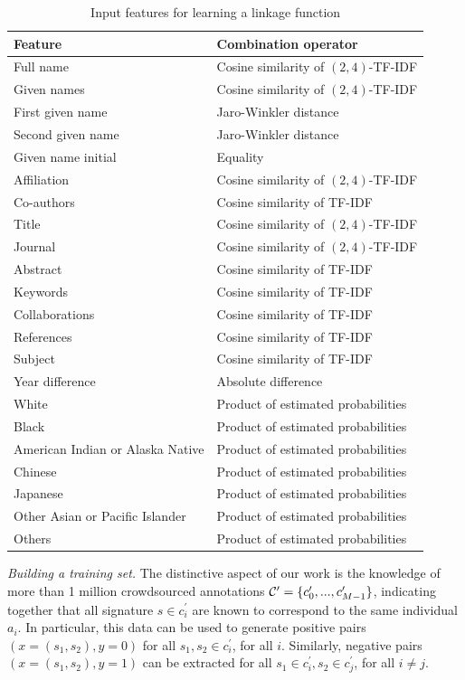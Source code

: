 \documentclass{article}
\newcommand{\glnote}[1]{\textcolor{red}{[GL: #1]}}
\begin{document}
\begin{table}
\caption{Input features for learning a linkage function}
\label{table:features}
\centering
\begin{tabular}{|l|l|}
  \hline
  \textbf{Feature} & \textbf{Combination operator}\\
  \hline
  \hline
  Full name & Cosine similarity of $(2,4)$-TF-IDF\\
  Given names & Cosine similarity of $(2,4)$-TF-IDF\\
  First given name & Jaro-Winkler distance\\
  Second given name & Jaro-Winkler distance\\
  Given name initial & Equality\\
  Affiliation & Cosine similarity of $(2,4)$-TF-IDF\\
  Co-authors & Cosine similarity of TF-IDF\\
  Title & Cosine similarity of $(2,4)$-TF-IDF\\
  Journal & Cosine similarity of $(2,4)$-TF-IDF\\
  Abstract & Cosine similarity of TF-IDF\\
  Keywords & Cosine similarity of TF-IDF\\
  Collaborations & Cosine similarity of TF-IDF\\
  References & Cosine similarity of TF-IDF\\
  Subject & Cosine similarity of TF-IDF\\
  Year difference & Absolute difference\\
  \hline
  White & Product of estimated probabilities\\
  Black & Product of estimated probabilities\\
  American Indian or Alaska Native & Product of estimated probabilities\\
  Chinese & Product of estimated probabilities\\
  Japanese & Product of estimated probabilities\\
  Other Asian or Pacific Islander & Product of estimated probabilities\\
  Others & Product of estimated probabilities\\
  \hline
\end{tabular}
\end{table}


\textit{Building a training set.} The distinctive aspect of our work is the
knowledge of more than 1 million crowdsourced annotations ${\cal C}^\prime = \{
c_0^\prime, ..., c_{M-1}^\prime \}$, indicating together that all signature $s \in
c_i^\prime$ are known to correspond to the same individual $a_i$.
In particular, this data can be used to generate positive pairs $(x=(s_1, s_2), y=0)$ for all
$s_1, s_2 \in c_i^\prime$, for all $i$. Similarly, negative pairs $(x=(s_1,
s_2), y=1)$ can be extracted for all $s_1 \in c_i^\prime, s_2 \in c_j^\prime$, for
all $i \neq j$.
\end{document}
